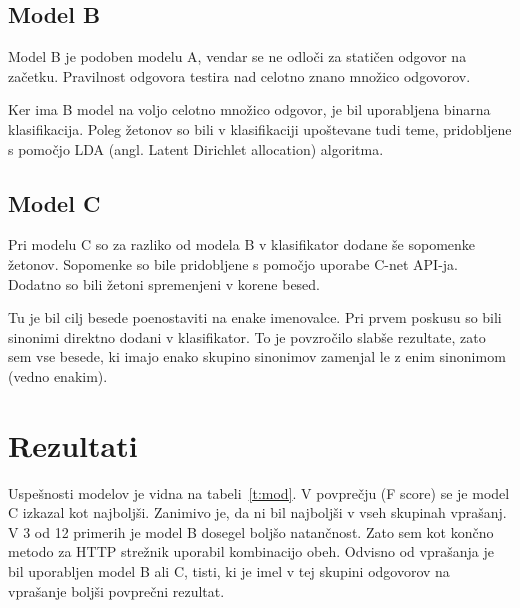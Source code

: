 \documentclass[journal]{IEEEtran}
\begin{document}
\subsection{Model B}
Model B je podoben modelu A, vendar se ne odloči za statičen odgovor na začetku. Pravilnost odgovora testira nad celotno znano množico odgovorov.

Ker ima B model na voljo celotno množico odgovor, je bil uporabljena binarna klasifikacija. Poleg žetonov so bili v klasifikaciji upoštevane tudi teme, pridobljene s pomočjo LDA (angl. Latent Dirichlet allocation) algoritma.

\subsection{Model C}
Pri modelu C so za razliko od modela B v klasifikator dodane še sopomenke žetonov. Sopomenke so bile pridobljene s pomočjo uporabe C-net API-ja. Dodatno so bili žetoni spremenjeni v korene besed.

Tu je bil cilj besede poenostaviti na enake imenovalce. Pri prvem poskusu so bili sinonimi direktno dodani v klasifikator. To je povzročilo slabše rezultate, zato sem vse besede, ki imajo enako skupino sinonimov zamenjal le z enim sinonimom (vedno enakim).


\section{Rezultati}
Uspešnosti modelov je vidna na tabeli~\ref{t:mod}. V povprečju (F score) se je model C izkazal kot najboljši. Zanimivo je, da ni bil najboljši v vseh skupinah vprašanj. V 3 od 12 primerih je model B dosegel boljšo natančnost. Zato sem kot končno metodo za HTTP strežnik uporabil kombinacijo obeh. Odvisno od vprašanja je bil uporabljen model B ali C, tisti, ki je imel v tej skupini odgovorov na vprašanje boljši povprečni rezultat.
\end{document}
